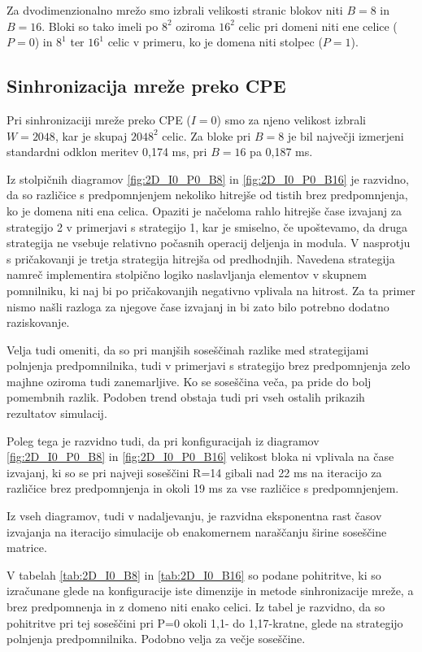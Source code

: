\documentclass[a4paper, 12pt, openright]{book}
\begin{document}
Za dvodimenzionalno mrežo smo izbrali velikosti stranic blokov niti \(B=8\) in \(B=16\).
Bloki so tako imeli po \(8^2\) oziroma \(16^2\) celic pri domeni niti ene celice (\(P=0\)) in \(8^1\) ter \(16^1\) celic v primeru, ko je domena niti stolpec (\(P=1\)).

\subsection{Sinhronizacija mreže preko CPE}

Pri sinhronizaciji mreže preko CPE (\(I=0\)) smo za njeno velikost izbrali \(W = 2048\), kar je skupaj \(2048^2\) celic.
Za bloke pri \(B=8\) je bil največji izmerjeni standardni odklon meritev 0,174 ms, pri \(B=16\) pa 0,187 ms.

Iz stolpičnih diagramov \ref{fig:2D_I0_P0_B8} in \ref{fig:2D_I0_P0_B16} je razvidno, da so različice s predpomnjenjem nekoliko hitrejše od tistih brez predpomnjenja, ko je domena niti ena celica.
Opaziti je načeloma rahlo hitrejše čase izvajanj za strategijo 2 v primerjavi s strategijo 1, kar je smiselno, če upoštevamo, da druga strategija ne vsebuje relativno počasnih operacij deljenja in modula.
V nasprotju s pričakovanji je tretja strategija hitrejša od predhodnjih.
Navedena strategija namreč implementira stolpično logiko naslavljanja elementov v skupnem pomnilniku, ki naj bi po pričakovanjih negativno vplivala na hitrost.
Za ta primer nismo našli razloga za njegove čase izvajanj in bi zato bilo potrebno dodatno raziskovanje.

Velja tudi omeniti, da so pri manjših soseščinah razlike med strategijami polnjenja predpomnilnika, tudi v primerjavi s strategijo brez predpomnjenja zelo majhne oziroma tudi zanemarljive. Ko se soseščina veča, pa pride do bolj pomembnih razlik. Podoben trend obstaja tudi pri vseh ostalih prikazih rezultatov simulacij.

Poleg tega je razvidno tudi, da pri konfiguracijah iz diagramov \ref{fig:2D_I0_P0_B8} in \ref{fig:2D_I0_P0_B16} velikost bloka ni vplivala na čase izvajanj, ki so se pri najveji soseščini R=14 gibali nad 22 ms na iteracijo za različice brez predpomnjenja in okoli 19 ms za vse različice s predpomnjenjem.

Iz vseh diagramov, tudi v nadaljevanju, je razvidna eksponentna rast časov izvajanja na iteracijo simulacije ob enakomernem naraščanju širine soseščine matrice.

V tabelah \ref{tab:2D_I0_B8} in \ref{tab:2D_I0_B16} so podane pohitritve, ki so izračunane glede na konfiguracije iste dimenzije in metode sinhronizacije mreže, a brez predpomnenja in z domeno niti enako celici.
Iz tabel je razvidno, da so pohitritve pri tej soseščini pri P=0 okoli 1,1- do 1,17-kratne, glede na strategijo polnjenja predpomnilnika. Podobno velja za večje soseščine.
\raggedbottom
\end{document}
